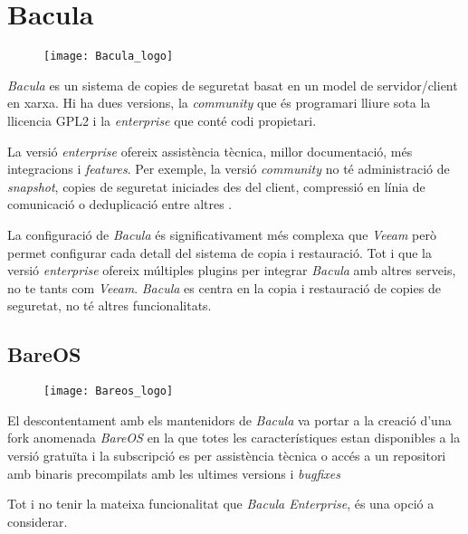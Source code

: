 
\section{Bacula}%
\label{sec:bacula}

\begin{figure}[H]
    \centering
    \texttt{[image: Bacula\_logo]}
\end{figure}


\emph{Bacula} es un sistema de copies de seguretat basat en un model de
servidor/client en xarxa. Hi ha dues versions, la \emph{community} que és
programari lliure sota la llicencia GPL2 i la \emph{enterprise} que conté
codi propietari.

La versió \emph{enterprise} ofereix assistència tècnica, millor documentació,
més integracions i \emph{features}. Per exemple, la versió \emph{community}
no té administració de \emph{snapshot}, copies de seguretat iniciades des del
client, compressió en línia de comunicació o deduplicació entre altres
\cite{noauthor_enterprise_nodate}.

La configuració de \emph{Bacula} és significativament més complexa que
\emph{Veeam} però permet configurar cada detall del sistema de copia i
restauració. Tot i que la versió \emph{enterprise} ofereix múltiples plugins per
integrar \emph{Bacula} amb altres serveis, no te tants com \emph{Veeam}.
\emph{Bacula} es centra en la copia i restauració de copies de seguretat, no té
altres funcionalitats.


\subsection{BareOS}%
\label{sub:bareos}

\begin{figure}[H]
    \centering
    \texttt{[image: Bareos\_logo]}
\end{figure}

El descontentament amb els mantenidors de \emph{Bacula} va portar a la creació
d'una fork anomenada \emph{BareOS} en la que totes les característiques estan
disponibles a la versió gratuïta i la subscripció es per
assistència tècnica o accés a un repositori amb binaris precompilats amb les
ultimes versions i \emph{bugfixes} \cite{noauthor_what_nodate-1,vermaden_why_2018}

Tot i no tenir la mateixa funcionalitat que \emph{Bacula Enterprise}, és una
opció a considerar.
